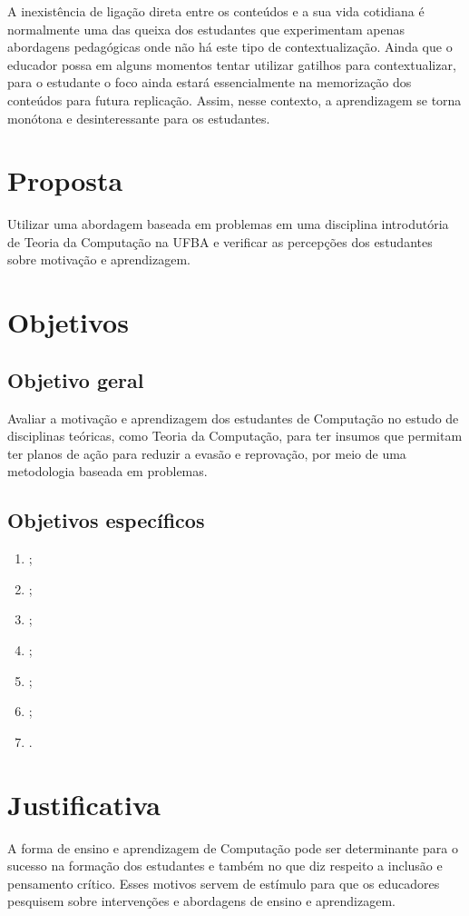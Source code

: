 A inexistência de ligação direta entre os conteúdos
e a sua vida cotidiana é normalmente uma das queixa dos estudantes
que experimentam apenas abordagens pedagógicas onde não
há este tipo de contextualização.
Ainda que o educador possa em alguns momentos tentar
utilizar gatilhos para contextualizar, para o
estudante o foco ainda estará essencialmente
na memorização dos conteúdos para futura
replicação.
Assim, nesse contexto, a aprendizagem se torna monótona
e desinteressante para os estudantes.


\section{Proposta}
\label{sec-proposta}
Utilizar uma abordagem baseada em problemas em uma disciplina
introdutória de Teoria da Computação na \ac{UFBA} e
verificar as percepções dos estudantes sobre
motivação e aprendizagem.

\section{Objetivos}
\label{sec-objetivos}

\subsection{Objetivo geral}
Avaliar a motivação e aprendizagem dos estudantes de Computação no estudo
de disciplinas teóricas, como Teoria da Computação, para ter insumos que permitam
ter planos de ação para reduzir a evasão e reprovação,
por meio de uma metodologia baseada em problemas.

\subsection{Objetivos específicos}
\begin{enumerate}
\item{\label{oe1ref} \oeatexto;}
\item{\label{oe2ref} \oebtexto;}
\item{\label{oe3ref} \oectexto;}
\item{\label{oe4ref} \oedtexto;}
\item{\label{oe5ref} \oeetexto;}
\item{\label{oe6ref} \oeftexto;}
\item{\label{oe7ref} \oegtexto.}
\end{enumerate}

\section{Justificativa}
A forma de ensino e aprendizagem de Computação pode
ser determinante para o sucesso na formação dos
estudantes e também no que diz respeito a inclusão
e pensamento crítico.
Esses motivos servem de estímulo
para que os educadores pesquisem sobre intervenções e
abordagens de ensino e aprendizagem.

